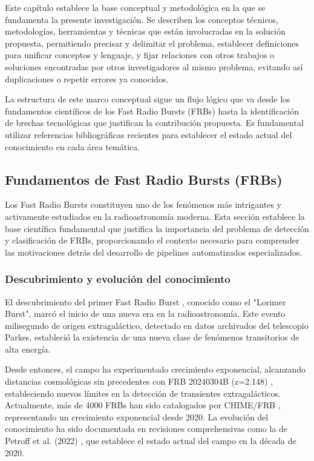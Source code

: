 
Este capítulo establece la base conceptual y metodológica en la que se fundamenta la presente investigación. Se describen los conceptos técnicos, metodologías, herramientas y técnicas que están involucradas en la solución propuesta, permitiendo precisar y delimitar el problema, establecer definiciones para unificar conceptos y lenguaje, y fijar relaciones con otros trabajos o soluciones encontradas por otros investigadores al mismo problema, evitando así duplicaciones o repetir errores ya conocidos.

La estructura de este marco conceptual sigue un flujo lógico que va desde los fundamentos científicos de los Fast Radio Bursts (FRBs) hasta la identificación de brechas tecnológicas que justifican la contribución propuesta. Es fundamental utilizar referencias bibliográficas recientes para establecer el estado actual del conocimiento en cada área temática.

\subsection{Fundamentos de Fast Radio Bursts (FRBs)}

Los Fast Radio Bursts constituyen uno de los fenómenos más intrigantes y activamente estudiados en la radioastronomía moderna. Esta sección establece la base científica fundamental que justifica la importancia del problema de detección y clasificación de FRBs, proporcionando el contexto necesario para comprender las motivaciones detrás del desarrollo de pipelines automatizados especializados.

\subsubsection{Descubrimiento y evolución del conocimiento}

El descubrimiento del primer Fast Radio Burst \cite{Lorimer_2007}, conocido como el "Lorimer Burst", marcó el inicio de una nueva era en la radioastronomía. Este evento milisegundo de origen extragaláctico, detectado en datos archivados del telescopio Parkes, estableció la existencia de una nueva clase de fenómenos transitorios de alta energía.

Desde entonces, el campo ha experimentado crecimiento exponencial, alcanzando distancias cosmológicas sin precedentes con FRB 20240304B (z=2.148) \cite{caleb2025fastradioburst3}, estableciendo nuevos límites en la detección de transientes extragalácticos. Actualmente, más de 4000 FRBs han sido catalogados por CHIME/FRB \cite{shin2025chimefrbdiscoveryextremelyactive}, representando un crecimiento exponencial desde 2020. La evolución del conocimiento ha sido documentada en revisiones comprehensivas como la de Petroff et al. (2022) \cite{Petroff_2022}, que establece el estado actual del campo en la década de 2020.

